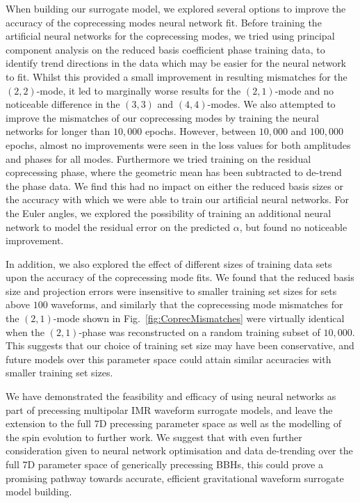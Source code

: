 \documentclass[prd,amssymb,amsmath,amsfonts,superscriptaddress,nofootinbib,reprint,showpacs, longbibliography]{revtex4-1}
\begin{document}
When building our surrogate model, we explored several options to improve the accuracy of the coprecessing modes neural network fit. Before training the artificial neural networks for the coprecessing modes, we tried using principal component analysis on the reduced basis coefficient phase training data, to identify trend directions in the data which may be easier for the neural network to fit. Whilst this provided a small improvement in resulting mismatches for the $(2,2)$-mode, it led to marginally worse results for the $(2,1)$-mode and no noticeable difference in the $(3,3)$ and $(4,4)$-modes. We also attempted to improve the mismatches of our coprecessing modes by training the neural networks for longer than $10,000$ epochs. However, between $10,000$ and $100,000$ epochs, almost no improvements were seen in the loss values for both amplitudes and phases for all modes. Furthermore we tried training on the residual coprecessing phase, where the geometric mean has been subtracted to de-trend the phase data. We find this had no impact on either the reduced basis sizes or the accuracy with which we were able to train our artificial neural networks. For the Euler angles, we explored the possibility of training an additional neural network to model the residual error on the predicted $\alpha$, but found no noticeable improvement.

In addition, we also explored the effect of different sizes of training data sets upon the accuracy of the coprecessing mode fits. We found that the reduced basis size and projection errors were insensitive to smaller training set sizes for sets above $100$ waveforms, and similarly that the coprecessing mode mismatches for the $(2,1)$-mode shown in Fig.~\ref{fig:CoprecMismatches} were virtually identical when the $(2,1)$-phase was reconstructed on a random training subset of $10,000$. This suggests that our choice of training set size may have been conservative, and future models over this parameter space could attain similar accuracies with smaller training set sizes.

We have demonstrated the feasibility and efficacy of using neural networks as part of precessing multipolar IMR waveform surrogate models, and leave the extension to the full 7D precessing parameter space as well as the modelling of the spin evolution to further work.
We suggest that with even further consideration given to neural network optimisation and data de-trending over the full 7D parameter space of generically precessing BBHs, this could prove a promising pathway towards accurate, efficient gravitational waveform surrogate model building.
\end{document}

